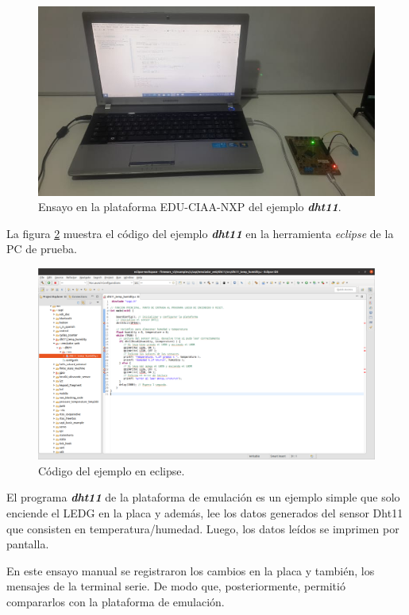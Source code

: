 \begin{figure}[ht]
	\centering
	\includegraphics[scale=.45]{./Figures/TestHardware.jpeg}
	\caption{Ensayo en la plataforma EDU-CIAA-NXP del ejemplo \textit{\textbf{dht11}}.}
	\label{fig:TestHardware}
\end{figure}



La figura \ref{fig:TestEclipse} muestra el código del ejemplo \textit{\textbf{dht11}} en la herramienta \textit{eclipse} de la PC de prueba.

\begin{figure}[ht]
	\centering
	\includegraphics[scale=.20]{./Figures/TestEclipse.png}
	\caption{Código del ejemplo en eclipse.}
	\label{fig:TestEclipse}
\end{figure}


El programa \textit{\textbf{dht11}} de la plataforma de emulación es un ejemplo simple que solo enciende el LEDG en la placa y además, lee los datos generados del sensor Dht11 que consisten en temperatura/humedad. Luego, los datos leídos se imprimen por pantalla. 

En este ensayo manual se registraron los cambios en la placa y también, los mensajes de la terminal serie. De modo que, posteriormente, permitió compararlos con la plataforma de emulación.

